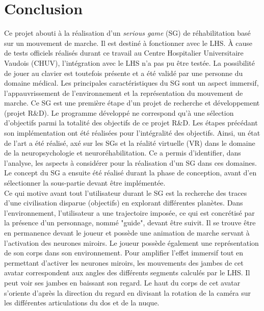 
\section{Conclusion}
Ce projet abouti à la réalisation d'un \textit{serious game} (SG) de réhabilitation basé sur un mouvement de marche. Il est destiné à fonctionner avec le LHS. À cause de tests officiels réalisés durant ce travail au Centre Hospitalier Universitaire Vaudois (CHUV), l'intégration avec le LHS n'a pas pu être testée. La possibilité de jouer au clavier est toutefois présente et a été validé par une personne du domaine médical. Les principales caractéristiques du SG sont un aspect immersif, l'appauvrissement de l'environnement et la représentation du mouvement de marche. 
Ce SG est une première étape d'un projet de recherche et développement (projet R\&D). Le programme développé ne correspond qu'à une sélection d'objectifs parmi la totalité des objectifs de ce projet R\&D. Les étapes précédant son implémentation ont été réalisées pour l'intégralité des objectifs. Ainsi, un état de l'art a été réalisé, axé sur les SGs et la réalité virtuelle (VR) dans le domaine de la neuropsychologie et neuroréhabilitation. Ce a permis d'identifier, dans l'analyse, les aspects à considérer pour la réalisation d'un SG dans ces domaines. Le concept du SG a ensuite été réalisé durant la phase de conception, avant d'en sélectionner la sous-partie devant être implémentée. 
\\

Ce qui motive avant tout l'utilisateur durant le SG est la recherche des traces d'une civilisation disparue (objectifs) en explorant différentes planètes. Dans l'environnement, l'utilisateur a une trajectoire imposée, ce qui est concrétisé par la présence d'un personnage, nommé "guide", devant être suivit. Il se trouve être en permanence devant le joueur et possède une animation de marche servant à l'activation des neurones miroirs. Le joueur possède également une représentation de son corps dans son environnement. Pour amplifier l'effet immersif tout en permettant d'activer les neurones miroirs, les mouvements des jambes de cet avatar correspondent aux angles des différents segments calculés par le LHS. Il peut voir ses jambes en baissant son regard. Le haut du corps de cet avatar s'oriente d'après la direction du regard en divisant la rotation de la caméra sur les différentes articulations du dos et de la nuque.
\\

